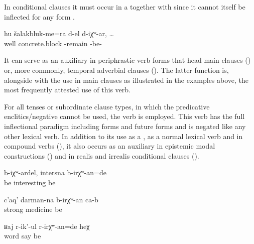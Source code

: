 In conditional clauses it must occur in a  together with  since it cannot itself be inflected for any  form .
%
\begin{exe}
	\ex	\label{ex:If the concrete blocks remained (are left over)}
	\gll	hu		šalakbluk-me=ra	d-el	d-iχʷ-ar,	\ldots\\
		well		concrete.block	-remain\tsc{.pfv}	-be-\\
	\glt	{}
\end{exe}

It can serve as an auxiliary in periphrastic verb forms that head main clauses () or, more commonly, temporal adverbial clauses (). The latter function is, alongside with the use in main clauses as illustrated in the examples above, the most frequently attested use of this verb.

For all tenses or subordinate clause types, in which the predicative enclitics\slash negative  cannot be used, the verb   is employed. This verb has the full inflectional paradigm including  forms  and future forms  and is negated like any other lexical verb. In addition to its use as a , as a normal lexical verb and in compound verbs (), it also occurs as an auxiliary in epistemic modal constructions  () and in realis  and irrealis conditional clauses ().
%
\begin{exe}
	\ex	\label{ex:If it would be like this, it would be interesting}
	\gll	b-iχʷ-ardel,	intersna	b-irχʷ-an=de\\
		be	interesting	be\\
	\glt	{}

	\ex	\label{ex:It will be a strong medicine}
	\gll	c'aq'	darman-na	b-irχʷ-an	ca-b\\
		strong	medicine be	\\
	\glt	{}

	\ex	\label{ex:She must have been quarreling}
	\gll	ʁaj	r-ik'-ul	r-irχʷ-an=de 	heχ\\
		word	say 	be 	\\
	\glt	{}
\end{exe}

